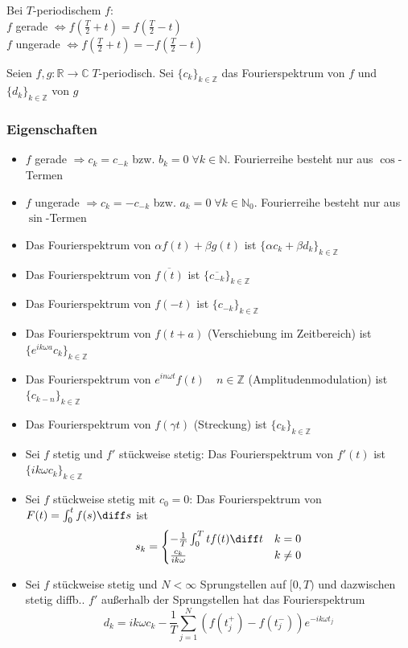 \begin{sectionbox}
    Bei $T$-periodischem $f$: \\
    $f$ gerade $\Leftrightarrow f(\frac{T}{2}+t) = f(\frac{T}{2}-t)$ \\
    $f$ ungerade $\Leftrightarrow f(\frac{T}{2}+t) = -f(\frac{T}{2}-t)$

    Seien $f,g:\mathbb R \rightarrow\mathbb C \; T$-periodisch. Sei $\{c_k\}_{k\in\mathbb Z}$ das Fourierspektrum von $f$ und $\{d_k\}_{k\in\mathbb Z}$ von $g$
    \subsubsection{Eigenschaften}
    \begin{itemize}
        \item $f$ gerade $\Rightarrow c_k=c_{-k}$ bzw. $b_k=0 \; \forall k \in\mathbb N$. Fourierreihe besteht nur aus $\cos$-Termen
        \item $f$ ungerade $\Rightarrow c_k=-c_{-k}$ bzw. $a_k=0 \; \forall k \in\mathbb N_0$. Fourierreihe besteht nur aus $\sin$-Termen
        \item Das Fourierspektrum von $\alpha f(t) + \beta g(t)$ ist $\{\alpha c_k + \beta d_k\}_{k\in\mathbb Z}$
        \item Das Fourierspektrum von $\overline{f(t)}$ ist $\{\overline{c_{-k}}\}_{k\in\mathbb Z}$
        \item Das Fourierspektrum von $f(-t)$ ist $\{c_{-k}\}_{k\in\mathbb Z}$
        \item Das Fourierspektrum von $f(t + a)$ (Verschiebung im Zeitbereich) ist $\{e^{ik\omega a}c_k\}_{k\in\mathbb Z}$
        \item Das Fourierspektrum von $e^{in\omega t}f(t) \quad n\in\mathbb Z$ (Amplitudenmodulation) ist $\{c_{k-n}\}_{k\in\mathbb Z}$
        \item Das Fourierspektrum von $f(\gamma t)$ (Streckung) ist $\{c_k\}_{k\in\mathbb Z}$
        \item Sei $f$ stetig und $f'$ stückweise stetig: Das Fourierspektrum von $f'(t)$ ist $\{ik\omega c_k\}_{k\in\mathbb Z}$
        \item Sei $f$ stückweise stetig mit $c_0=0$: Das Fourierspektrum von $F(t)=\int_0^t f(s)\diff s$ ist
              \begin{equation*}
                  s_k=\begin{cases}
                      -\frac{1}{T}\int_0^Ttf(t)\diff t & k=0    \\
                      \frac{c_k}{ik\omega}             & k\ne 0
                  \end{cases}
              \end{equation*}
        \item Sei $f$ stückweise stetig und $N < \infty$ Sprungstellen auf $[0,T)$ und dazwischen stetig diffb.. $f'$ außerhalb der Sprungstellen hat das Fourierspektrum \begin{equation*}
                  d_k=ik\omega c_k-\frac{1}{T}\sum_{j=1}^{N}(f(t_j^+) - f(t_j^-))e^{-ik\omega t_j}
              \end{equation*}
    \end{itemize}


\end{sectionbox}
